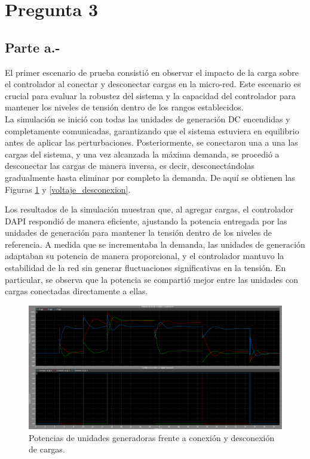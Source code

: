 \section{Pregunta 3}

\subsection{Parte a.-}

El primer escenario de prueba consistió en observar el impacto de la carga sobre el controlador al conectar y desconectar cargas en la micro-red. Este escenario es crucial para evaluar la robustez del sistema y la capacidad del controlador para mantener los niveles de tensión dentro de los rangos establecidos.\\

La simulación se inició con todas las unidades de generación DC encendidas y completamente comunicadas, garantizando que el sistema estuviera en equilibrio antes de aplicar las perturbaciones. Posteriormente, se conectaron una a una las cargas del sistema, y una vez alcanzada la máxima demanda, se procedió a desconectar las cargas de manera inversa, es decir, desconectándolas gradualmente hasta eliminar por completo la demanda. De aquí se obtienen las Figuras \ref{potencia_desconexion} y \ref{voltaje_desconexion}.


Los resultados de la simulación muestran que, al agregar cargas, el controlador DAPI respondió de manera eficiente, ajustando la potencia entregada por las unidades de generación para mantener la tensión dentro de los niveles de referencia. A medida que se incrementaba la demanda, las unidades de generación adaptaban su potencia de manera proporcional, y el controlador mantuvo la estabilidad de la red sin generar fluctuaciones significativas en la tensión. En particular, se observa que la potencia se compartió mejor entre las unidades con cargas conectadas directamente a ellas. \\


\begin{figure}
    \centering
    \includegraphics[width=0.5\linewidth]{Tarea 2/report/imagenes/p3a/potencia.png}
    \caption{Potencias de unidades generadoras frente a conexión y desconexión de cargas.}
    \label{potencia_desconexion}
\end{figure}

